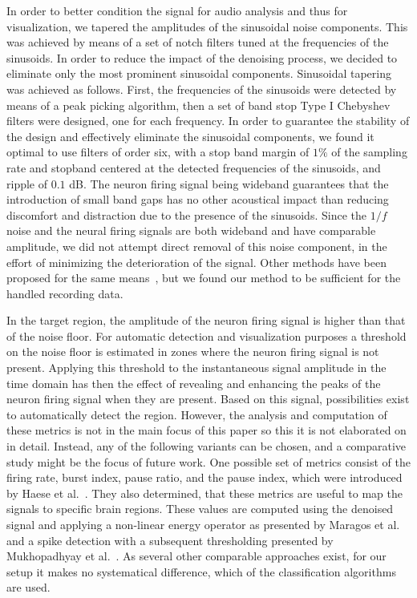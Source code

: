 \documentclass{vgtc}                          %
\begin{document}
In order to better condition the signal for audio analysis and thus for visualization, we tapered the amplitudes of the sinusoidal noise components. This was achieved by means of a set of notch filters tuned at the frequencies of the sinusoids. In order to reduce the impact of the denoising process, we decided to eliminate only the most prominent sinusoidal components. Sinusoidal tapering was achieved as follows. First, the frequencies of the sinusoids were detected by means of a peak picking algorithm, then a set of band stop Type I Chebyshev filters were designed, one for each frequency. In order to guarantee the stability of the design and effectively eliminate the sinusoidal components, we found it optimal to use filters of order six, with a stop band margin of $1\%$ of the sampling rate and stopband centered at the detected frequencies of the sinusoids, and ripple of $0.1$ dB. The neuron firing signal being wideband guarantees that the introduction of small band gaps has no other acoustical impact than reducing discomfort and distraction due to the presence of the sinusoids. Since the $1/f$ noise and the neural firing signals are both wideband and have comparable amplitude, we did not attempt direct removal of this noise component, in the effort of minimizing the deterioration of the signal. Other methods have been proposed for the same means~\cite{Jansen,Donoho1995}, but we found our method to be sufficient for the handled recording data.

In the target region, the amplitude of the neuron firing signal is higher than that of the noise floor. For automatic detection and visualization purposes a threshold on the noise floor is estimated in zones where the neuron firing signal is not present. Applying this threshold to the instantaneous signal amplitude in the time domain has then the effect of revealing and enhancing the peaks of the neuron firing signal when they are present. Based on this signal, possibilities exist to automatically detect the region. However, the analysis and computation of these metrics is not in the main focus of this paper so this it is not elaborated on in detail. Instead, any of the following variants can be chosen, and a comparative study might be the focus of future work. One possible set of metrics consist of the firing rate, burst index, pause ratio, and the pause index, which were introduced by Haese et al.~\cite{Haese2005}. They also determined, that these metrics are useful to map the signals to specific brain regions. These values are computed using the denoised signal and applying a non-linear energy operator as presented by Maragos et al.~\cite{Maragos1993} and a spike detection with a subsequent thresholding presented by Mukhopadhyay et al.~\cite{Mukhopadhyay1998}. As several other comparable approaches exist, for our setup it makes no systematical difference, which of the classification algorithms are used.
\end{document}
